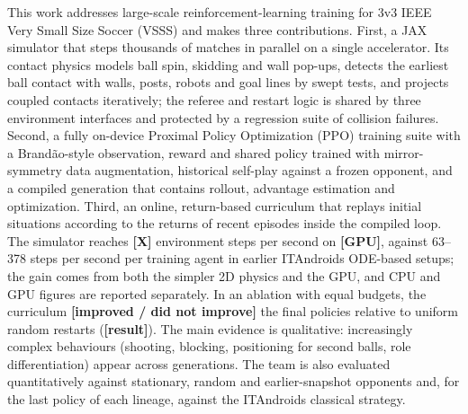 This work addresses large-scale reinforcement-learning training for 3v3 IEEE Very Small Size Soccer (VSSS) and makes three contributions. First, a JAX simulator that steps thousands of matches in parallel on a single accelerator. Its contact physics models ball spin, skidding and wall pop-ups, detects the earliest ball contact with walls, posts, robots and goal lines by swept tests, and projects coupled contacts iteratively; the referee and restart logic is shared by three environment interfaces and protected by a regression suite of collision failures. Second, a fully on-device Proximal Policy Optimization (PPO) training suite with a Brand\~ao-style observation, reward and shared policy trained with mirror-symmetry data augmentation, historical self-play against a frozen opponent, and a compiled generation that contains rollout, advantage estimation and optimization. Third, an online, return-based curriculum that replays initial situations according to the returns of recent episodes inside the compiled loop. The simulator reaches \textbf{[X]} environment steps per second on \textbf{[GPU]}, against 63--378 steps per second per training agent in earlier ITAndroids ODE-based setups; the gain comes from both the simpler 2D physics and the GPU, and CPU and GPU figures are reported separately. In an ablation with equal budgets, the curriculum \textbf{[improved / did not improve]} the final policies relative to uniform random restarts (\textbf{[result]}). The main evidence is qualitative: increasingly complex behaviours (shooting, blocking, positioning for second balls, role differentiation) appear across generations. The team is also evaluated quantitatively against stationary, random and earlier-snapshot opponents and, for the last policy of each lineage, against the ITAndroids classical strategy.
